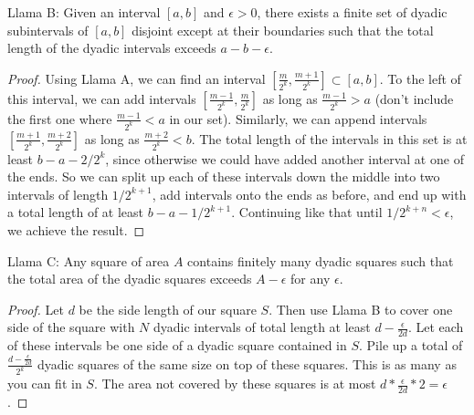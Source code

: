 \documentclass[11pt, oneside]{article}   	%
\begin{document}
Llama B: Given an interval $[a, b]$ and $\epsilon > 0$, there exists a finite set of dyadic subintervals of $[a, b]$ disjoint except at their boundaries such that the total length of the dyadic intervals exceeds $a - b - \epsilon$.
\begin{proof}
Using Llama A, we can find an interval $[\frac{m}{2^k}, \frac{m+1}{2^k}] \subset [a, b]$. To the left of this interval, we can add intervals $[\frac{m-1}{2^k}, \frac{m}{2^k}]$ as long as $\frac{m-1}{2^k} > a$ (don't include the first one where $\frac{m-1}{2^k} < a$ in our set). Similarly, we can append intervals $[\frac{m+1}{2^k}, \frac{m+2}{2^k}]$ as long as $\frac{m+2}{2^k} < b$. The total length of the intervals in this set is at least $b - a - 2/2^k$, since otherwise we could have added another interval at one of the ends. So we can split up each of these intervals down the middle into two intervals of length $1/2^{k+1}$, add intervals onto the ends as before, and end up with a total length of at least $b - a - 1/2^{k + 1}$. Continuing like that until $1/2^{k+n} < \epsilon$, we achieve the result.
\end{proof}

Llama C: Any square of area $A$ contains finitely many dyadic squares such that the total area of the dyadic squares exceeds $A - \epsilon$ for any $\epsilon$. 
\begin{proof}
Let $d$ be the side length of our square $S$. Then use Llama B to cover one side of the square with $N$ dyadic intervals of total length at least $d - \frac{\epsilon}{2d}$. Let each of these intervals be one side of a dyadic square contained in $S$. Pile up a total of $\frac{d-\frac{\epsilon}{2d}}{2^k}$ dyadic squares of the same size on top of these squares. This is as many as you can fit in $S$. The area not covered by these squares is at most $d * \frac{\epsilon}{2d} * 2 = \epsilon$.
\end{proof}
\end{document}
